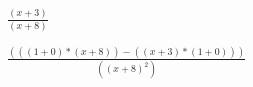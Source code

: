 \documentclass{article}
\begin{document}
$\frac{ ( x + 3 ) }{( x + 8 ) }$

$\frac{ ( ( ( 1 + 0 ) * ( x + 8 ) ) - ( ( x + 3 ) * ( 1 + 0 ) ) ) }{( ( x + 8 ) ^ 2 ) }$
\end{document}
